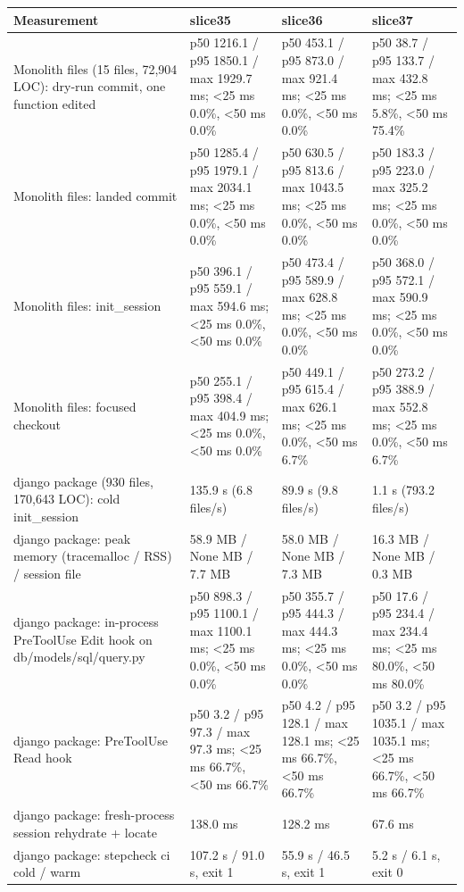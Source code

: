 \documentclass{article}
\begin{document}
\begin{table}[h]
\centering
\begin{tabular}{llll}
\toprule
Measurement & slice35 & slice36 & slice37 \\
\midrule
Monolith files (15 files, 72,904 LOC): dry-run commit, one function edited & p50 1216.1 / p95 1850.1 / max 1929.7 ms; <25 ms 0.0\%, <50 ms 0.0\% & p50 453.1 / p95 873.0 / max 921.4 ms; <25 ms 0.0\%, <50 ms 0.0\% & p50 38.7 / p95 133.7 / max 432.8 ms; <25 ms 5.8\%, <50 ms 75.4\% \\
Monolith files: landed commit & p50 1285.4 / p95 1979.1 / max 2034.1 ms; <25 ms 0.0\%, <50 ms 0.0\% & p50 630.5 / p95 813.6 / max 1043.5 ms; <25 ms 0.0\%, <50 ms 0.0\% & p50 183.3 / p95 223.0 / max 325.2 ms; <25 ms 0.0\%, <50 ms 0.0\% \\
Monolith files: init\_session & p50 396.1 / p95 559.1 / max 594.6 ms; <25 ms 0.0\%, <50 ms 0.0\% & p50 473.4 / p95 589.9 / max 628.8 ms; <25 ms 0.0\%, <50 ms 0.0\% & p50 368.0 / p95 572.1 / max 590.9 ms; <25 ms 0.0\%, <50 ms 0.0\% \\
Monolith files: focused checkout & p50 255.1 / p95 398.4 / max 404.9 ms; <25 ms 0.0\%, <50 ms 0.0\% & p50 449.1 / p95 615.4 / max 626.1 ms; <25 ms 0.0\%, <50 ms 6.7\% & p50 273.2 / p95 388.9 / max 552.8 ms; <25 ms 0.0\%, <50 ms 6.7\% \\
django package (930 files, 170,643 LOC): cold init\_session & 135.9 s (6.8 files/s) & 89.9 s (9.8 files/s) & 1.1 s (793.2 files/s) \\
django package: peak memory (tracemalloc / RSS) / session file & 58.9 MB / None MB / 7.7 MB & 58.0 MB / None MB / 7.3 MB & 16.3 MB / None MB / 0.3 MB \\
django package: in-process PreToolUse Edit hook on db/models/sql/query.py & p50 898.3 / p95 1100.1 / max 1100.1 ms; <25 ms 0.0\%, <50 ms 0.0\% & p50 355.7 / p95 444.3 / max 444.3 ms; <25 ms 0.0\%, <50 ms 0.0\% & p50 17.6 / p95 234.4 / max 234.4 ms; <25 ms 80.0\%, <50 ms 80.0\% \\
django package: PreToolUse Read hook & p50 3.2 / p95 97.3 / max 97.3 ms; <25 ms 66.7\%, <50 ms 66.7\% & p50 4.2 / p95 128.1 / max 128.1 ms; <25 ms 66.7\%, <50 ms 66.7\% & p50 3.2 / p95 1035.1 / max 1035.1 ms; <25 ms 66.7\%, <50 ms 66.7\% \\
django package: fresh-process session rehydrate + locate & 138.0 ms & 128.2 ms & 67.6 ms \\
django package: stepcheck ci cold / warm & 107.2 s / 91.0 s, exit 1 & 55.9 s / 46.5 s, exit 1 & 5.2 s / 6.1 s, exit 0 \\

\end{tabular}
\end{table}
\end{document}
